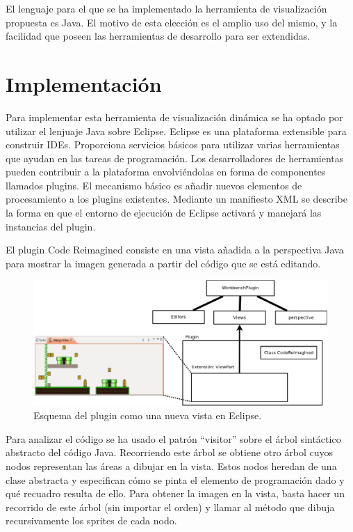 \documentclass{llncs}
\begin{document}
El lenguaje para el que se ha implementado la herramienta de visualización propuesta es Java. El motivo de esta elección es el amplio uso del mismo, y la facilidad que poseen las herramientas de desarrollo para ser extendidas.



\section{Implementación}
\label{sec:details}
Para implementar esta herramienta de visualización dinámica se ha optado por utilizar el lenjuaje Java sobre Eclipse. Eclipse es una plataforma extensible para construir IDEs. Proporciona servicios básicos para utilizar varias herramientas que ayudan en las tareas de programación. Los desarrolladores de herramientas pueden contribuir a la plataforma envolviéndolas en forma de componentes llamados plugins. El mecanismo básico es añadir nuevos elementos de procesamiento a los plugins existentes. Mediante un manifiesto XML se describe la forma en que el entorno de ejecución de Eclipse activará y manejará las instancias del plugin. 

El plugin Code Reimagined consiste en una vista añadida a la perspectiva Java para mostrar la imagen generada a partir del código que se está editando. 

\begin{figure}[ht]
\begin{center}
\includegraphics[scale=0.3]{images/crplugin.eps}
\caption{Esquema del plugin como una nueva vista en Eclipse.
\label{fig:crplugin}}
\end{center}
\end{figure}

Para analizar el código se ha usado el patrón ``visitor'' sobre el árbol sintáctico abstracto del código Java. Recorriendo este árbol se obtiene otro árbol cuyos nodos representan las áreas a dibujar en la vista. Estos nodos heredan de una clase abstracta y especifican cómo se pinta el elemento de programación dado y qué recuadro resulta de ello. Para obtener la imagen en la vista, basta hacer un recorrido de este árbol (sin importar el orden) y llamar al método que dibuja recursivamente los sprites de cada nodo. 
\end{document}
